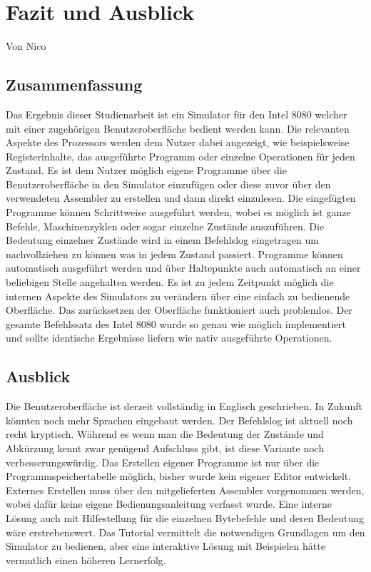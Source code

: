 \documentclass[12pt]{article}
\begin{document}
\section{Fazit und Ausblick}
Von Nico \\

\noindent
\subsection{Zusammenfassung}
Das Ergebnis dieser Studienarbeit ist ein Simulator für den Intel 8080 welcher mit einer zugehörigen Benutzeroberfläche bedient werden kann. Die relevanten Aspekte des Prozessors werden dem Nutzer dabei angezeigt, wie beispielsweise Registerinhalte, das ausgeführte Programm oder einzelne Operationen für jeden Zustand. Es ist dem Nutzer möglich eigene Programme über die Benutzeroberfläche in den Simulator einzufügen oder diese zuvor über den verwendeten Assembler zu erstellen und dann direkt einzulesen. Die eingefügten Programme können Schrittweise ausgeführt werden, wobei es möglich ist ganze Befehle, Maschinenzyklen oder sogar einzelne Zustände auszuführen. Die Bedeutung einzelner Zustände wird in einem Befehlslog eingetragen um nachvollziehen zu können was in jedem Zustand passiert. Programme können automatisch ausgeführt werden und über Haltepunkte auch automatisch an einer beliebigen Stelle angehalten werden. Es ist zu jedem Zeitpunkt möglich die internen Aspekte des Simulators zu verändern über eine einfach zu bedienende Oberfläche. Das zurücksetzen der Oberfläche funktioniert auch problemlos. Der gesamte Befehlssatz des Intel 8080 wurde so genau wie möglich implementiert und sollte identische Ergebnisse liefern wie nativ ausgeführte Operationen.

\subsection{Ausblick}
Die Benutzeroberfläche ist derzeit vollständig in Englisch geschrieben. In Zukunft könnten noch mehr Sprachen eingebaut werden. Der Befehlslog ist aktuell noch recht kryptisch. Während es wenn man die Bedeutung der Zustände und Abkürzung kennt zwar genügend Aufschluss gibt, ist diese Variante noch verbesserungswürdig. Das Erstellen eigener Programme ist nur über die Programmspeichertabelle möglich, bisher wurde kein eigener Editor entwickelt. Externes Erstellen muss über den mitgelieferten Assembler vorgenommen werden, wobei dafür keine eigene Bedienungsanleitung verfasst wurde. Eine interne Lösung auch mit Hilfestellung für die einzelnen Bytebefehle und deren Bedeutung wäre erstrebenswert. Das Tutorial vermittelt die notwendigen Grundlagen um den Simulator zu bedienen, aber eine interaktive Lösung mit Beispielen hätte vermutlich einen höheren Lernerfolg.
\end{document}
